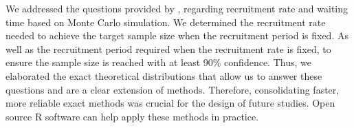 We addressed the questions provided by \cite{carter2004application}, regarding recruitment rate and waiting time based on Monte Carlo simulation. We determined the recruitment rate needed to achieve the target sample size when the recruitment period is fixed. As well as the recruitment period required when the recruitment rate is fixed, to ensure the sample size is reached with at least 90\% confidence. Thus, we elaborated the exact theoretical distributions that allow us to answer these questions and are a clear extension of \cite{carter2004application} methods. Therefore, consolidating faster, more reliable exact methods was crucial for the design of future studies. Open source R software can help apply these methods in practice.
% 
